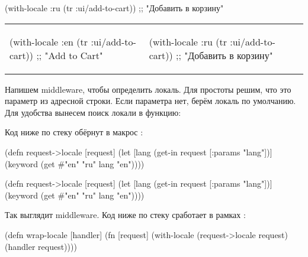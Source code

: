 \splitter

\begin{clojure}
(with-locale :ru
  (tr :ui/add-to-cart))
;; "Добавить в корзину"
\end{clojure}

\else


\noindent
\begin{tabular}{ @{}p{5cm} @{}p{5cm} }

\begin{clojure}
(with-locale :en
  (tr :ui/add-to-cart))
;; "Add to Cart"
\end{clojure}

&

\begin{clojure}
(with-locale :ru
  (tr :ui/add-to-cart))
;; "Добавить в корзину"
\end{clojure}

\end{tabular}


\fi


Напишем middleware, чтобы определить локаль. Для простоты решим, что это
параметр  из адресной строки. Если параметра нет, берём локаль по
умолчанию. Для удобства вынесем поиск локали в функцию:

Код ниже по стеку обёрнут в макрос :

\ifnarrow

\begin{clojure}
(defn request->locale [request]
  (let [lang (get-in request
               [:params "lang"])]
    (keyword
      (get #{"en" "ru"} lang "en"))))
\end{clojure}

\else

\begin{clojure}
(defn request->locale [request]
  (let [lang (get-in request [:params "lang"])]
    (keyword (get #{"en" "ru"} lang "en"))))
\end{clojure}

\fi

Так выглядит middleware. Код ниже по стеку сработает в рамках
:

\ifnarrow

\begin{clojure}
(defn wrap-locale [handler]
  (fn [request]
    (with-locale
      (request->locale request)
      (handler request))))
\end{clojure}


